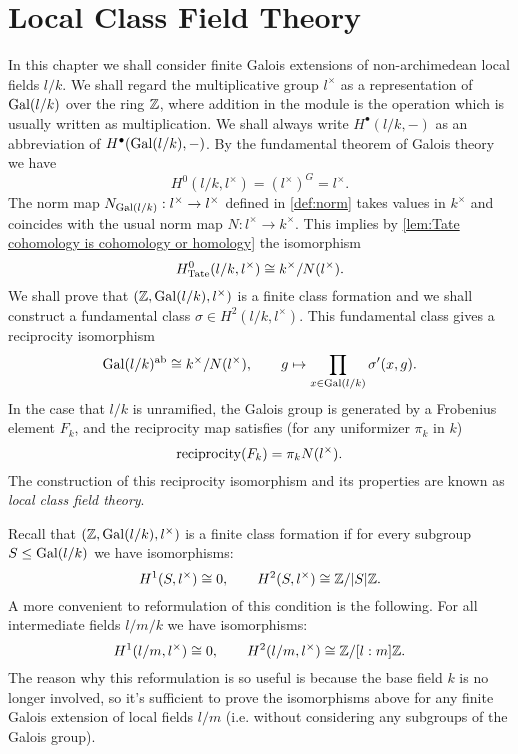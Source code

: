 \chapter{Local Class Field Theory}

In this chapter we shall consider finite Galois extensions of non-archimedean local fields $l/k$.
We shall regard the multiplicative group $l^\times$
as a representation of $\mathrm{Gal}(l/k)$ over the ring ${\mathbb Z}$, where
addition in the module is the operation which is usually written as multiplication.
We shall always write $H^\bullet(l/k,-)$ as an abbreviation of $H^\bullet(\mathrm{Gal}(l/k),-)$.
By the fundamental theorem of Galois theory we have
\[
	H^0(l/k,l^\times) = (l^\times)^G = l^\times.
\]
The norm map $N_{\mathrm{Gal}(l/k)} : l^\times \to l^\times$ defined in \ref{def:norm}
takes values in $k^\times$ and coincides with the usual norm map $N : l^\times \to k^\times$. This implies by
\ref{lem:Tate cohomology is cohomology or homology} the isomorphism
\[
	H^0_{\mathrm{Tate}}(l/k,l^\times) \cong k^\times / N(l^\times).
\]
We shall prove that $({\mathbb Z},\mathrm{Gal}(l/k),l^\times)$ is a finite class formation and we shall construct a
fundamental class $\sigma \in H^2(l/k, l^\times)$.
This fundamental class gives a reciprocity isomorphism
\[
	\mathrm{Gal}(l/k)^{\mathrm{ab}}
	\cong
	k^\times / N(l^\times), \qquad
	g \mapsto \prod_{x \in \mathrm{Gal}(l/k)} \sigma'(x,g).
\]
In the case that $l/k$ is unramified, the Galois group is generated by a Frobenius element $F_k$,
and the reciprocity map satisfies (for any uniformizer $\pi_k$ in $k$)
\[
	\mathrm{reciprocity}(F_k) = \pi_k N(l^\times).
\]
The construction of this reciprocity isomorphism and its properties are known as
\emph{local class field theory}.

Recall that $({\mathbb Z},\mathrm{Gal}(l/k),l^\times)$ is a finite class formation if for every subgroup
$S \le \mathrm{Gal}(l/k)$ we have isomorphisms:
\[
	H^1(S,l^\times) \cong 0, \qquad H^2(S,l^\times) \cong {\mathbb Z} / |S| {\mathbb Z}.
\]
A more convenient to reformulation of this condition is the following.
For all intermediate fields $l / m / k$ we have isomorphisms:
\[
	H^1(l/m,l^\times) \cong 0, \qquad H^2(l/m,l^\times) \cong {\mathbb Z} / [l:m] {\mathbb Z}.
\]
The reason why this reformulation is so useful is because the base field $k$ is no longer involved,
so it's sufficient to prove the isomorphisms above for any finite Galois extension of local fields $l/m$
(i.e. without considering any subgroups of the Galois group).

